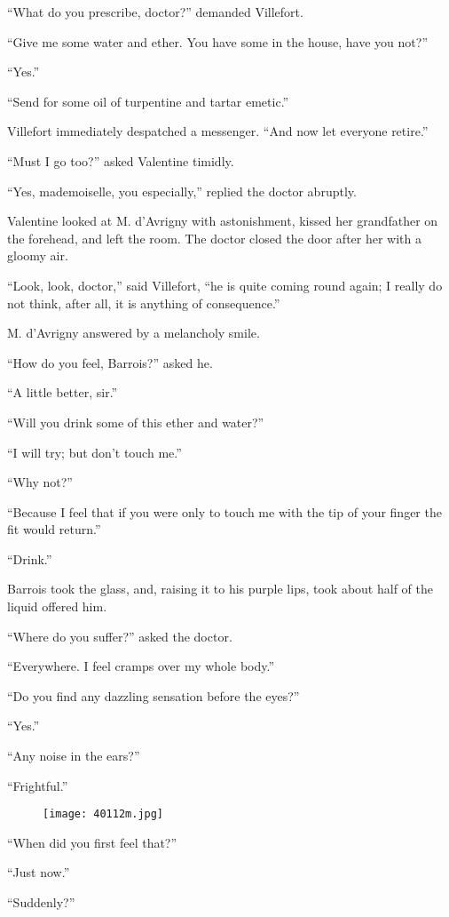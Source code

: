 “What do you prescribe, doctor?” demanded Villefort.

“Give me some water and ether. You have some in the house, have you
not?”

“Yes.”

“Send for some oil of turpentine and tartar emetic.”

Villefort immediately despatched a messenger. “And now let everyone
retire.”

“Must I go too?” asked Valentine timidly.

“Yes, mademoiselle, you especially,” replied the doctor abruptly.

Valentine looked at M. d’Avrigny with astonishment, kissed her
grandfather on the forehead, and left the room. The doctor closed the
door after her with a gloomy air.

“Look, look, doctor,” said Villefort, “he is quite coming round again;
I really do not think, after all, it is anything of consequence.”

M. d’Avrigny answered by a melancholy smile.

“How do you feel, Barrois?” asked he.

“A little better, sir.”

“Will you drink some of this ether and water?”

“I will try; but don’t touch me.”

“Why not?”

“Because I feel that if you were only to touch me with the tip of your
finger the fit would return.”

“Drink.”

Barrois took the glass, and, raising it to his purple lips, took about
half of the liquid offered him.

“Where do you suffer?” asked the doctor.

“Everywhere. I feel cramps over my whole body.”

“Do you find any dazzling sensation before the eyes?”

“Yes.”

“Any noise in the ears?”

“Frightful.”

\begin{figure}[ht]
\texttt{[image: 40112m.jpg]}
\end{figure}

“When did you first feel that?”

“Just now.”

“Suddenly?”

